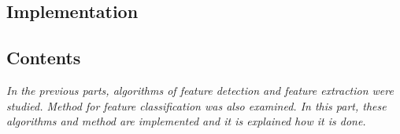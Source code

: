   \begin{titlepage}
    \vspace*{\fill}
      \part{Implementation}
    \vspace*{\fill}
  \end{titlepage}

\startcontents[parts]

\chapter*{Contents}

\textit{In the previous parts, algorithms of feature detection and feature extraction were studied. Method for feature classification was also examined. In this part, these algorithms and method are implemented and it is explained how it is done.} 

\vspace{\baselineskip}


\pagebreak

\newpage

\newpage

\newpage


\stopcontents[parts]
